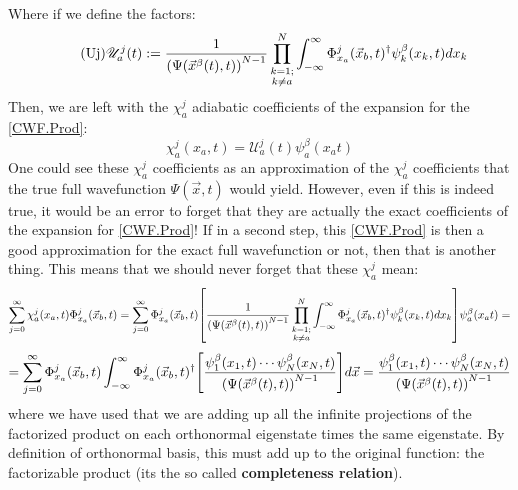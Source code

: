 \documentclass[11pt, a4paper]{article} %
\newcommand{\U}{\mathscr{U}}
\begin{document}
Where if we define the factors:
\begin{equation}\label{Uj}\tag{Uj}
\U^j_a(t):=\frac{1}{ \qty(\Psi(\vec{x}^\beta(t),t))^{N-1}}\prod_{\substack{k=1; \\ k\neq a}}^{N} \int_{-\infty}^\infty \Phi_{x_a}^j(\vec{x}_b,t)^\dagger \psi^\beta_k(x_k,t) dx_k 
\end{equation}
Then, we are left with the $\chi^j_a$ adiabatic coefficients of the expansion for the \ref{CWF.Prod}:
$$
\chi_a^j(x_a,t)= \U^j_a(t)\psi_a^\beta(x_a t)
$$
One could see these $\chi^j_a$ coefficients as an approximation of the $\chi_a^j$ coefficients that the true full wavefunction $\Psi(\vec{x},t)$ would yield. However, even if this is indeed true, it would be an error to forget that they are actually the exact coefficients of the expansion for \ref{CWF.Prod}! If in a second step, this \ref{CWF.Prod} is then a good approximation for the exact full wavefunction or not, then that is another thing. This means that we should never forget that these $\chi_a^j$ mean:
$$
\sum_{j=0}^\infty \chi^j_a(x_a,t) \Phi_{x_a}^j(\vec{x}_b,t) = \sum_{j=0}^\infty \Phi_{x_a}^j(\vec{x}_b,t) \qty[\frac{1}{ \qty(\Psi(\vec{x}^\beta(t),t))^{N-1}}\prod_{\substack{k=1; \\ k\neq a}}^{N} \int_{-\infty}^\infty \Phi_{x_a}^j(\vec{x}_b,t)^\dagger \psi^\beta_k(x_k,t) dx_k ] \psi_a^\beta(x_a t)=
$$
$$
=\sum_{j=0}^\infty \Phi_{x_a}^j(\vec{x}_b,t)\int_{-\infty}^\infty \Phi_{x_a}^j(\vec{x}_b,t)^\dagger \qty[ \frac{\psi^\beta_1(x_1,t)\cdots \psi^\beta_N(x_N,t) }{\qty(\Psi(\vec{x}^\beta(t),t))^{N-1}} ]d\vec{x}=\frac{\psi^\beta_1(x_1,t)\cdots \psi^\beta_N(x_N,t) }{\qty(\Psi(\vec{x}^\beta(t),t))^{N-1}}
$$
where we have used that we are adding up all the infinite projections of the factorized product on each orthonormal eigenstate times the same eigenstate. By definition of orthonormal basis, this must add up to the original function: the factorizable product (its the so called {\bf completeness relation}).\\
\end{document}
